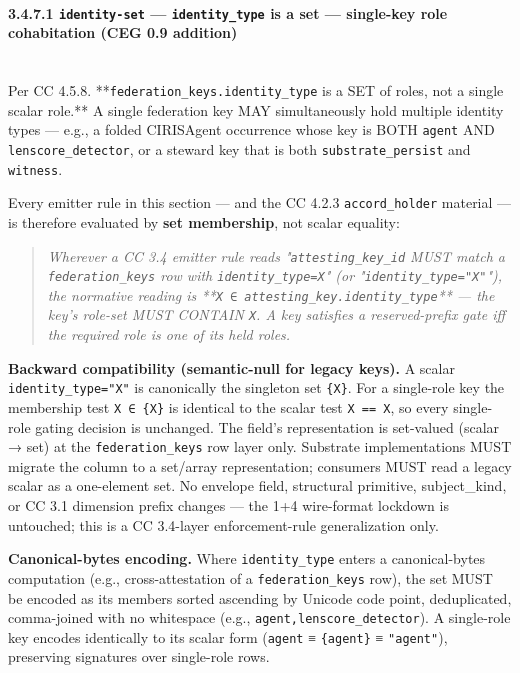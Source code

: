 \documentclass[11pt]{article}
\begin{document}
\paragraph{3.4.7.1 \texttt{identity-set} — \texttt{identity\_type} is a set — single-key role cohabitation (CEG 0.9 addition)}\mbox{}\\


Per CC 4.5.8. **\texttt{federation\_keys.identity\_type} is a SET of roles, not a single scalar role.** A single federation key MAY simultaneously hold multiple identity types — e.g., a folded CIRISAgent occurrence whose key is BOTH \texttt{agent} AND \texttt{lenscore\_detector}, or a steward key that is both \texttt{substrate\_persist} and \texttt{witness}.


Every emitter rule in this section — and the CC 4.2.3 \texttt{accord\_holder} material — is therefore evaluated by \textbf{set membership}, not scalar equality:


\begin{quote}\itshape Wherever a CC 3.4 emitter rule reads "\texttt{attesting\_key\_id} MUST match a \texttt{federation\_keys} row with \texttt{identity\_type=X}" (or "\texttt{identity\_type="X"}"), the normative reading is **\texttt{X ∈ attesting\_key.identity\_type}** — the key's role-set MUST CONTAIN \texttt{X}. A key satisfies a reserved-prefix gate iff the required role is one of its held roles.\end{quote}


\textbf{Backward compatibility (semantic-null for legacy keys).} A scalar \texttt{identity\_type="X"} is canonically the singleton set \texttt{\{X\}}. For a single-role key the membership test \texttt{X ∈ \{X\}} is identical to the scalar test \texttt{X == X}, so every single-role gating decision is unchanged. The field's representation is set-valued (scalar → set) at the \texttt{federation\_keys} row layer only. Substrate implementations MUST migrate the column to a set/array representation; consumers MUST read a legacy scalar as a one-element set. No envelope field, structural primitive, subject\_kind, or CC 3.1 dimension prefix changes — the 1+4 wire-format lockdown is untouched; this is a CC 3.4-layer enforcement-rule generalization only.


\textbf{Canonical-bytes encoding.} Where \texttt{identity\_type} enters a canonical-bytes computation (e.g., cross-attestation of a \texttt{federation\_keys} row), the set MUST be encoded as its members sorted ascending by Unicode code point, deduplicated, comma-joined with no whitespace (e.g., \texttt{agent,lenscore\_detector}). A single-role key encodes identically to its scalar form (\texttt{agent} ≡ \texttt{\{agent\}} ≡ \texttt{"agent"}), preserving signatures over single-role rows.
\end{document}
